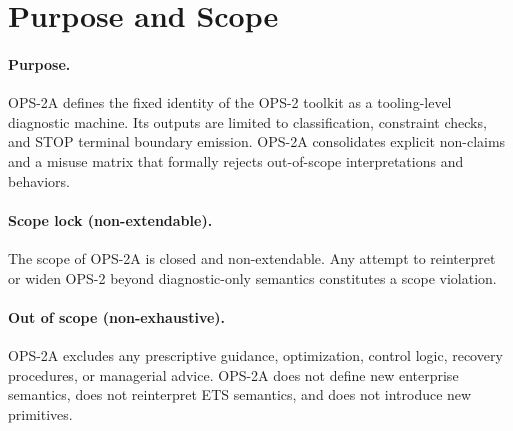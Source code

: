 ﻿%

\section{Purpose and Scope}

\paragraph{Purpose.}
OPS-2A defines the fixed identity of the OPS-2 toolkit as a tooling-level diagnostic
machine. Its outputs are limited to classification, constraint checks, and STOP
terminal boundary emission. OPS-2A consolidates explicit non-claims and a misuse
matrix that formally rejects out-of-scope interpretations and behaviors.

\paragraph{Scope lock (non-extendable).}
The scope of OPS-2A is closed and non-extendable. Any attempt to reinterpret or widen
OPS-2 beyond diagnostic-only semantics constitutes a scope violation.

\paragraph{Out of scope (non-exhaustive).}
OPS-2A excludes any prescriptive guidance, optimization, control logic, recovery
procedures, or managerial advice. OPS-2A does not define new enterprise semantics,
does not reinterpret ETS semantics, and does not introduce new primitives.
